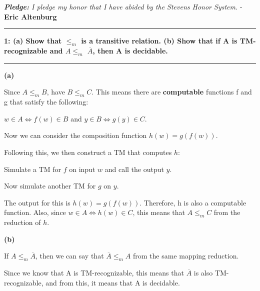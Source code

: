 \documentclass[11pt]{article}
\newcommand\question[2]{\vspace{.25in}\hrule\textbf{#1: #2}\vspace{.5em}\hrule\vspace{.10in}}
\renewcommand\part[1]{\vspace{.10in}\textbf{(#1)}\par}
\begin{document}
\raggedright
\newcommand\NAME{Eric Altenburg}  %
\newcommand\COURSE{CS-334}
\newcommand\HWNUM{9}              %
\newcommand{\bigO}{\mathcal{O}}


\begin{center}
	\textit{\textbf{Pledge:} I pledge my honor that I have abided by the Stevens Honor System.} - \textbf{\NAME}
\end{center}


\question{1}{(a) Show that $\le_{m}$ is a transitive relation. (b) Show that if A is TM-recognizable and $A \le_{m}$ $\overline{A}$, then A is decidable.}
	\part{a}
		Since $A\le_{m}B$, have $B\le_{m}C$. This means there are \textbf{computable} functions f and g that satisfy the following:\par
		$w \in A \Longleftrightarrow f(w) \in B$ and $y \in B \Longleftrightarrow g(y) \in C$. \par
		Now we can consider the composition function $h(w) = g(f(w))$. \par
		Following this, we then construct a TM that computes $h$:\par
		Simulate a TM for $f$ on input $w$ and call the output $y$. \par
		Now simulate another TM for $g$ on $y$.\par
		The output for this is $h(w) = g(f(w))$. Therefore, h is also a computable function. Also, since $w\in A \Longleftrightarrow h(w) \in C$, this means that $A\le_{m}C$ from the reduction of $h$.\par
		
	\part{b}
		If $A \le_{m} \overline{A}$, then we can say that $\overline{A} \le_{m} A$ from the same mapping reduction.\par
		Since we know that A is TM-recognizable, this means that $\overline{A}$ is also TM-recognizable, and from this, it means that A is decidable.\par
\end{document}
